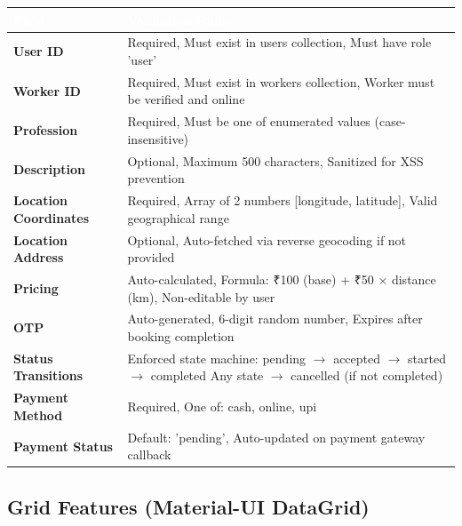 \documentclass[12pt,a4paper]{article}
\begin{document}
\begin{table}[H]
\centering
\renewcommand{\arraystretch}{1.8}
\begin{tabularx}{\textwidth}{|p{4.5cm}|X|}
\hline
\rowcolor{headerblue}
\textcolor{white}{\textbf{Field}} & \textcolor{white}{\textbf{Validation Rules}} \\
\hline
\rowcolor{lightgray}
\textbf{User ID} & Required, Must exist in users collection, Must have role 'user' \\
\hline
\textbf{Worker ID} & Required, Must exist in workers collection, Worker must be verified and online \\
\hline
\rowcolor{lightgray}
\textbf{Profession} & Required, Must be one of enumerated values (case-insensitive) \\
\hline
\textbf{Description} & Optional, Maximum 500 characters, Sanitized for XSS prevention \\
\hline
\rowcolor{lightgray}
\textbf{Location Coordinates} & Required, Array of 2 numbers [longitude, latitude], Valid geographical range \\
\hline
\textbf{Location Address} & Optional, Auto-fetched via reverse geocoding if not provided \\
\hline
\rowcolor{lightgray}
\textbf{Pricing} & Auto-calculated, Formula: ₹100 (base) + ₹50 × distance (km), Non-editable by user \\
\hline
\textbf{OTP} & Auto-generated, 6-digit random number, Expires after booking completion \\
\hline
\rowcolor{lightgray}
\textbf{Status Transitions} & Enforced state machine: \newline pending $\rightarrow$ accepted $\rightarrow$ started $\rightarrow$ completed \newline Any state $\rightarrow$ cancelled (if not completed) \\
\hline
\textbf{Payment Method} & Required, One of: cash, online, upi \\
\hline
\rowcolor{lightgray}
\textbf{Payment Status} & Default: 'pending', Auto-updated on payment gateway callback \\
\hline
\end{tabularx}
\end{table}

\subsection*{Grid Features (Material-UI DataGrid)}
\end{document}
